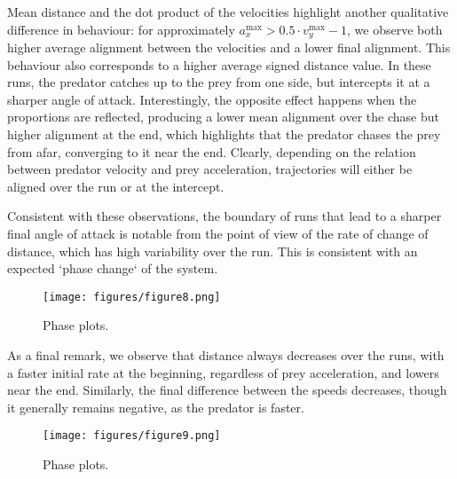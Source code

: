 \documentclass[11pt]{article}
\begin{document}
Mean distance and the dot product of the velocities highlight another qualitative difference in behaviour: for approximately $a^{\text{max}}_x > 0.5\cdot v^{\text{max}}_y - 1$, we observe both higher average alignment between the velocities and a lower final alignment. This behaviour also corresponds to a higher average signed distance value. In these runs, the predator catches up to the prey from one side, but intercepts it at a sharper angle of attack. Interestingly, the opposite effect happens when the proportions are reflected, producing a lower mean alignment over the chase but higher alignment at the end, which highlights that the predator chases the prey from afar, converging to it near the end. Clearly, depending on the relation between predator velocity and prey acceleration, trajectories will either be aligned over the run or at the intercept.

Consistent with these observations, the boundary of runs that lead to a sharper final angle of attack is notable from the point of view of the rate of change of distance, which has high variability over the run. This is consistent with an expected `phase change` of the system.

\begin{figure}[htbp]
  \centering
  \texttt{[image: figures/figure8.png]}
  \caption{Phase plots.}
  \label{fig:phaseplot3}
\end{figure}

As a final remark, we observe that distance always decreases over the runs, with a faster initial rate at the beginning, regardless of prey acceleration, and lowers near the end. Similarly, the final difference between the speeds decreases, though it generally remains negative, as the predator is faster.

\begin{figure}[htbp]
  \centering
  \texttt{[image: figures/figure9.png]}
  \caption{Phase plots.}
  \label{fig:phaseplot4}
\end{figure}

\hfil
\end{document}
